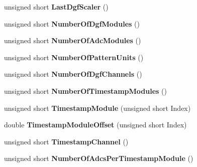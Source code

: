 \begin{DoxyCompactItemize}
\item 
\mbox{\label{class_global_settings_a808e23c6df71ad3156777d8f6e3232b4}} 
unsigned short {\bfseries Last\+Dgf\+Scaler} ()
\item 
\mbox{\label{class_global_settings_ad3c488b383c9894b0f40747da7a32613}} 
unsigned short {\bfseries Number\+Of\+Dgf\+Modules} ()
\item 
\mbox{\label{class_global_settings_a0036e842692c336fcd4fd918b180f708}} 
unsigned short {\bfseries Number\+Of\+Adc\+Modules} ()
\item 
\mbox{\label{class_global_settings_a7706b4e61b18ee710e025229b99002c6}} 
unsigned short {\bfseries Number\+Of\+Pattern\+Units} ()
\item 
\mbox{\label{class_global_settings_a47372087c05f31209288e4cac4b1ce04}} 
unsigned short {\bfseries Number\+Of\+Dgf\+Channels} ()
\item 
\mbox{\label{class_global_settings_a5d61c4fefad9ffe29a9a296641bf1f3c}} 
unsigned short {\bfseries Number\+Of\+Timestamp\+Modules} ()
\item 
\mbox{\label{class_global_settings_abb55f0b2ec5c870d739e86cbf9496b7d}} 
unsigned short {\bfseries Timestamp\+Module} (unsigned short Index)
\item 
\mbox{\label{class_global_settings_a10705cb601c558b8a5e6bc6344eaa5ad}} 
double {\bfseries Timestamp\+Module\+Offset} (unsigned short Index)
\item 
\mbox{\label{class_global_settings_aaab0288f44318a1ad732edabd1bdf2f4}} 
unsigned short {\bfseries Timestamp\+Channel} ()
\item 
\mbox{\label{class_global_settings_aa749f02a0a70decee11846ba3ceb044c}} 
unsigned short {\bfseries Number\+Of\+Adcs\+Per\+Timestamp\+Module} ()
\item 
\mbox{\label{class_global_settings_a71ac24fe36fc3f7cc2844bdfedb2ea72}} 

\end{DoxyCompactItemize}
